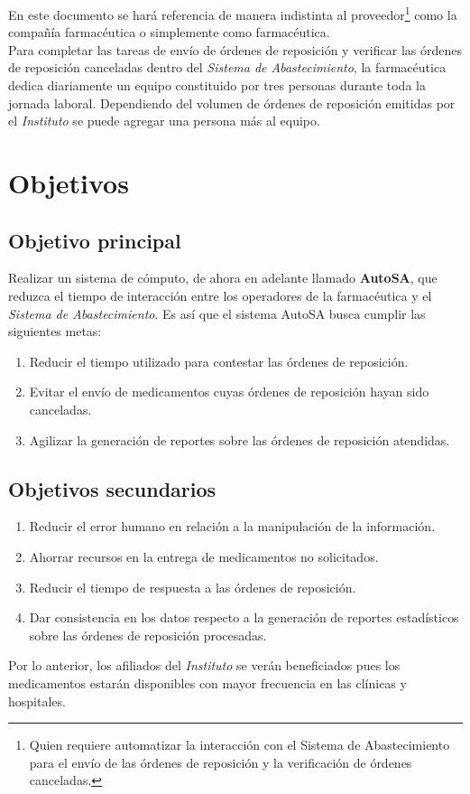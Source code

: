 En este documento se hará referencia de manera indistinta al proveedor\footnote{Quien requiere automatizar la interacción con el Sistema de Abastecimiento para el envío de las órdenes de reposición y la verificación de órdenes canceladas.} como la compañía farmacéutica o simplemente como farmacéutica.\\
Para completar las tareas de envío de órdenes de reposición y verificar las órdenes de reposición canceladas dentro del \textit{Sistema de Abastecimiento}, la farmacéutica dedica diariamente un equipo constituido por tres personas durante toda la jornada laboral. Dependiendo del volumen de órdenes de reposición emitidas por el \textit{Instituto} se puede agregar una persona más al equipo.

\section{Objetivos}
\subsection{Objetivo principal}\label{sec:objetivo-principal}
Realizar un sistema de cómputo, de ahora en adelante llamado \textbf{AutoSA}, que reduzca el tiempo de interacción entre los operadores de la farmacéutica y el \textit{Sistema de Abastecimiento}. Es así que el sistema AutoSA busca cumplir las siguientes metas:
\begin{enumerate}
	\item Reducir el tiempo utilizado para contestar las órdenes de reposición.
	\item Evitar el envío de medicamentos cuyas órdenes de reposición hayan sido canceladas.
	\item Agilizar la generación de reportes sobre las órdenes de reposición atendidas.
\end{enumerate}

\subsection{Objetivos secundarios}\label{sec:objetivos-secundarios}
\begin{enumerate}
\item Reducir el error humano en relación a la manipulación de la información.
\item Ahorrar recursos en la entrega de medicamentos no solicitados.
\item Reducir el tiempo de respuesta a las órdenes de reposición.
\item Dar consistencia en los datos respecto a la generación de reportes estadísticos sobre las órdenes de reposición procesadas.
\end{enumerate}
Por lo anterior, los afiliados del \textit{Instituto} se verán beneficiados pues los medicamentos estarán disponibles con mayor frecuencia en las clínicas y hospitales.

